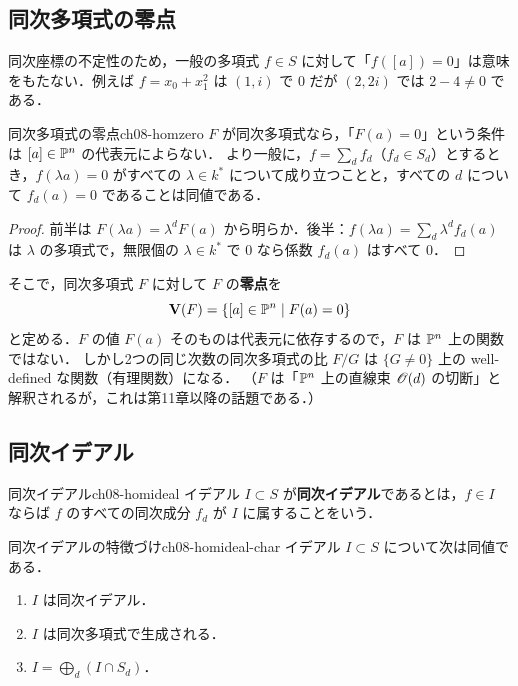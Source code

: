 \subsection{同次多項式の零点}

同次座標の不定性のため，一般の多項式 $f\in S$ に対して「$f([a])=0$」は意味をもたない．例えば $f=x_0+x_1^2$ は $(1,i)$ で $0$ だが $(2,2i)$ では $2-4\neq0$ である．

\begin{myprop}{同次多項式の零点}{ch08-homzero}
$F$ が同次多項式なら，「$F(a)=0$」という条件は $[a]\in\mathbb{P}^n$ の代表元によらない．
より一般に，$f=\sum_df_d$（$f_d\in S_d$）とするとき，$f(\lambda a)=0$ がすべての $\lambda\in k^*$ について成り立つことと，すべての $d$ について $f_d(a)=0$ であることは同値である．
\end{myprop}

\begin{proof}
前半は $F(\lambda a)=\lambda^dF(a)$ から明らか．後半：$f(\lambda a)=\sum_d\lambda^df_d(a)$ は $\lambda$ の多項式で，無限個の $\lambda\in k^*$ で $0$ なら係数 $f_d(a)$ はすべて $0$．
\end{proof}

そこで，同次多項式 $F$ に対して $F$ の\textbf{零点}を
\[
  \mathbf{V}(F)=\{[a]\in\mathbb{P}^n\mid F(a)=0\}
\]
と定める．$F$ の値 $F(a)$ そのものは代表元に依存するので，$F$ は $\mathbb{P}^n$ 上の関数ではない．
しかし2つの同じ次数の同次多項式の比 $F/G$ は $\{G\neq0\}$ 上の well-defined な関数（有理関数）になる．
（$F$ は「$\mathbb{P}^n$ 上の直線束 $\mathscr{O}(d)$ の切断」と解釈されるが，これは第11章以降の話題である．）

\subsection{同次イデアル}\label{sec:ch08-homideal}

\begin{mydef}{同次イデアル}{ch08-homideal}
イデアル $I\subset S$ が\textbf{同次イデアル}であるとは，$f\in I$ ならば $f$ のすべての同次成分 $f_d$ が $I$ に属することをいう．
\end{mydef}

\begin{myprop}{同次イデアルの特徴づけ}{ch08-homideal-char}
イデアル $I\subset S$ について次は同値である．
\begin{enumerate}
  \item $I$ は同次イデアル．
  \item $I$ は同次多項式で生成される．
  \item $I=\bigoplus_d(I\cap S_d)$．
\end{enumerate}
\end{myprop}

